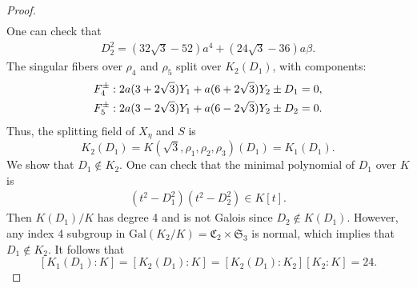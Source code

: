 \documentclass[10pt,a4paper]{amsart}
\def\Gal{\mathrm{Gal}}
\def\fC{{\mathfrak C}}
\def\fS{{\mathfrak S}}
\begin{document}
\begin{proof}
\begin{align}
\end{align}
One can check that 
\begin{align*}
D_2^2=(32\sqrt3-52)a^4+(24\sqrt3-36)a\beta.
\end{align*}
The singular fibers over $\rho_4$ and $\rho_5$ split over $K_2(D_1)$, with components: 
\begin{align}\label{eqn:I3fiber2}
    F_4^\pm&: 2a(3+2\sqrt{3} )Y_1+a(6+2\sqrt3)Y_2\pm{D_1}=0,\\\notag
    F_5^\pm&: 2a(3-2\sqrt{3} )Y_1+a(6-2\sqrt3)Y_2\pm{D_2}=0.
\end{align}
Thus, the splitting field of $X_\eta$ and $S$ is 
$$
K_2(D_1)=K(\sqrt3,\rho_1,\rho_2,\rho_3)(D_1)=K_1(D_1).
$$
We show that $D_1\notin K_2$. 
One can check that the minimal polynomial of $D_1$ over $K$ is 
\begin{align}
 \label{eqn:I3D1mini}   
 (t^2-D_1^2)(t^2-D_2^2)\in K[t].
\end{align}
Then $K(D_1)/K$ has degree 4 and is not Galois since $D_2\not\in K(D_1)$.
However, any index 4 subgroup in $\Gal(K_2/K)=\fC_2\times\fS_3$ is normal, which implies that $D_1\notin K_2$. It follows that 
$$
[K_1(D_1):K]=[K_2(D_1):K]=[K_2(D_1):K_2][K_2:K]=24.
$$ 


\end{proof}
\end{document}
